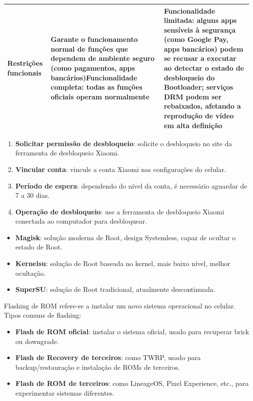 \begin{center}
\begin{tabularx}{\linewidth}{|X|X|X|}
Restrições funcionais & Garante o funcionamento normal de funções que dependem de ambiente seguro (como pagamentos, apps bancários)\newline Funcionalidade completa: todas as funções oficiais operam normalmente & Funcionalidade limitada: alguns apps sensíveis à segurança (como Google Pay, apps bancários) podem se recusar a executar ao detectar o estado de desbloqueio do Bootloader; serviços DRM podem ser rebaixados, afetando a reprodução de vídeo em alta definição \tabularnewline
\hline
\end{tabularx}
\end{center}


\begin{enumerate}
  \item \textbf{Solicitar permissão de desbloqueio}: solicite o desbloqueio no site da ferramenta de desbloqueio Xiaomi.
  \item \textbf{Vincular conta}: vincule a conta Xiaomi nas configurações do celular.
  \item \textbf{Período de espera}: dependendo do nível da conta, é necessário aguardar de 7 a 30 dias.
  \item \textbf{Operação de desbloqueio}: use a ferramenta de desbloqueio Xiaomi conectada ao computador para desbloquear.
\end{enumerate}


\begin{itemize}
  \item \textbf{Magisk}: solução moderna de Root, design Systemless, capaz de ocultar o estado de Root.
  \item \textbf{Kernelsu}: solução de Root baseada no kernel, mais baixo nível, melhor ocultação.
  \item \textbf{SuperSU}: solução de Root tradicional, atualmente descontinuada.
\end{itemize}


Flashing de ROM refere-se a instalar um novo sistema operacional no celular. Tipos comuns de flashing:

\begin{itemize}
  \item \textbf{Flash de ROM oficial}: instalar o sistema oficial, usado para recuperar brick ou downgrade.
  \item \textbf{Flash de Recovery de terceiros}: como TWRP, usado para backup/restauração e instalação de ROMs de terceiros.
  \item \textbf{Flash de ROM de terceiros}: como LineageOS, Pixel Experience, etc., para experimentar sistemas diferentes.
\end{itemize}

